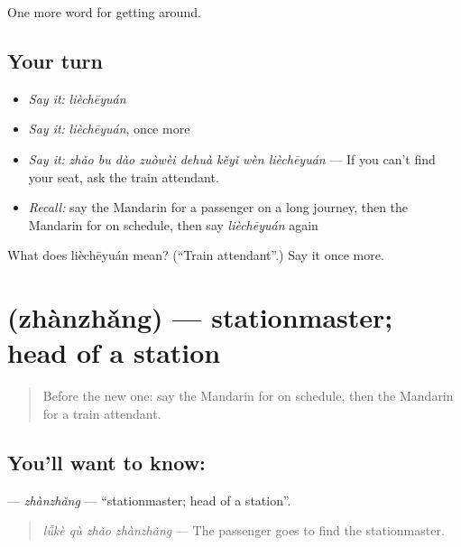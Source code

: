 \begin{grammarlens}[title={What you've built}]
One more word for getting around.
\end{grammarlens}

\subsection*{Your turn}
\begin{itemize}
\raggedright
  \item \emph{Say it:} \emph{lièchēyuán}
  \item \emph{Say it:} \emph{lièchēyuán}, once more
  \item \emph{Say it:} \emph{zhǎo bu dào zuòwèi dehuà kěyǐ wèn lièchēyuán} — If you can't find your seat, ask the train attendant.
  \item \emph{Recall:} say the Mandarin for a passenger on a long journey, then the Mandarin for on schedule, then say \emph{lièchēyuán} again
\end{itemize}

\begin{tcolorbox}[breakable,colback=teal!4,colframe=teal!35!black,title={Before you move on}]
What does lièchēyuán mean? (\textquotedblleft{}Train attendant\textquotedblright{}.) Say it once more.
\end{tcolorbox}
\section[\texorpdfstring{\zh{站长} (zhànzhǎng)}{站长 (zhànzhǎng)}]{ (zhànzhǎng) — stationmaster; head of a station}

\label{lesson:ZH-C403-zhanzhang}



\begin{quote}
Before the new one: say the Mandarin for on schedule, then the Mandarin for a train attendant.
\end{quote}

\subsection*{You'll want to know: }
\textbf{} — \emph{zhànzhǎng} — \textquotedblleft{}stationmaster; head of a station\textquotedblright{}.

\begin{quote}
\textbf{} \emph{lǚkè qù zhǎo zhànzhǎng} — The passenger goes to find the stationmaster.
\end{quote}

